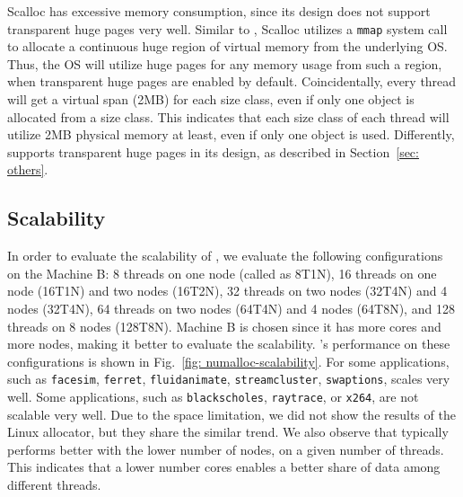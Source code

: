  Scalloc has excessive memory consumption, since its design does not support transparent huge pages very well. Similar to \NM{}, Scalloc utilizes a \texttt{mmap} system call to allocate a continuous huge region of virtual memory from the underlying OS. Thus, the OS will utilize huge pages for any memory usage from such a region, when transparent huge pages are enabled by default. Coincidentally, every thread will get a virtual span (2MB) for each size class, even if only one object is allocated from a size class. This indicates that each size class of each thread will utilize 2MB physical memory at least, even if only one object is used.  Differently, \NM{} supports transparent huge pages in its design, as described in Section~\ref{sec: others}.
 

\subsection{Scalability}
\label{sec:scale}

In order to evaluate the scalability of \NM{}, we evaluate the following configurations on the Machine B: 8 threads on one node (called as 8T1N), 16 threads on one node (16T1N) and two nodes (16T2N), 32 threads on two nodes (32T4N) and 4 nodes (32T4N), 64 threads on two nodes (64T4N) and 4 nodes (64T8N), and 128 threads on 8 nodes (128T8N). Machine B is chosen since it has more cores and more nodes, making it better to evaluate the scalability. \NM{}'s performance on these configurations is shown in Fig.~\ref{fig: numalloc-scalability}. For some applications, such as \texttt{facesim}, \texttt{ferret}, \texttt{fluidanimate}, \texttt{streamcluster}, \texttt{swaptions}, \NM{} scales very well. Some applications, such as \texttt{blackscholes}, \texttt{raytrace}, or \texttt{x264}, are not scalable very well. Due to the space limitation, we did not show the results of the Linux allocator, but they share the similar trend. We also observe that \NM{} typically performs better with the lower number of nodes, on a given number of threads.  This indicates that a lower number cores enables a better share of data among different threads. 

